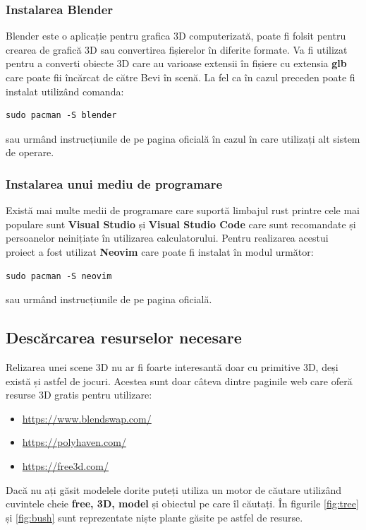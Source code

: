 \subsubsection{Instalarea Blender}
Blender este o aplicație pentru grafica 3D computerizată, poate fi folsit pentru crearea de grafică 3D sau convertirea fișierelor în diferite formate. Va fi utilizat pentru a converti obiecte 3D care au varioase extensii în fișiere cu extensia \textbf{glb} care poate fii încărcat de către Bevi în scenă.
La fel ca în cazul preceden poate fi instalat utilizând comanda:
\begin{lstlisting}
sudo pacman -S blender
\end{lstlisting}
sau urmând instrucțiunile de pe pagina oficială\cite{InstallBlender} în cazul în care utilizați alt sistem de operare.

\subsubsection{Instalarea unui mediu de programare}
Există mai multe medii de programare care suportă limbajul rust printre cele mai populare sunt \textbf{Visual Studio} și \textbf{Visual Studio Code} care sunt recomandate și persoanelor neinițiate în utilizarea calculatorului. Pentru realizarea acestui proiect a fost utilizat  \textbf{Neovim} care poate fi instalat în modul următor:
\begin{lstlisting}
sudo pacman -S neovim
\end{lstlisting}
sau urmând instrucțiunile de pe pagina oficială\cite{InstallNvim}.

\subsection{Descărcarea resurselor necesare}
Relizarea unei scene 3D nu ar fi foarte interesantă doar cu primitive 3D, deși există și astfel de jocuri. Acestea sunt doar câteva dintre paginile web care oferă resurse 3D gratis pentru utilizare:
\begin{itemize}
    \item\url{https://www.blendswap.com/}
    \item\url{https://polyhaven.com/}
    \item\url{https://free3d.com/}
\end{itemize}
Dacă nu ați găsit modelele dorite puteți utiliza un motor de căutare utilizând cuvintele cheie \textbf{free, 3D, model} și obiectul pe care îl căutați.
În figurile \ref{fig:tree} și \ref{fig:bush} sunt reprezentate niște plante găsite pe astfel de resurse.


